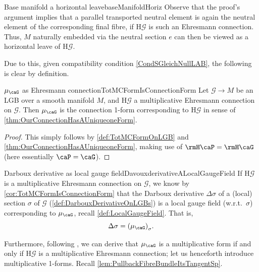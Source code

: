 \documentclass[reqno,a4paper,oneside]{amsart}
\newcommand\mutot{\mu_\caG}
\theoremstyle{plain}
\theoremstyle{remark}
\theoremstyle{definition}
\begin{document}
\begin{remarks}{Base manifold a horizontal leave}{baseManifoldHoriz}
Observe that the proof's argument implies that a parallel transported neutral element is again the neutral element of the corresponding final fibre, if $\mathrm{H}\mathcal{G}$ is such an Ehresmann connection. Thus, $M$ naturally embedded via the neutral section $e$ can then be viewed as a horizontal leave of $\mathrm{H}\mathcal{G}$.
\end{remarks}

Due to this, given compatibility condition \eqref{CondSGleichNullLAB}, the following is clear by definition.

\begin{corollaries}{$\mutot$ as Ehresmann connection}{TotMCFormIsConnectionForm}
Let $\mathcal{G} \to M$ be an LGB over a smooth manifold $M$, and $\mathrm{H}\mathcal{G}$ a multiplicative Ehresmann connection on $\mathcal{G}$. Then $\mutot$ is the connection 1-form corresponding to $\mathrm{H}\mathcal{G}$ in sense of \ref{thm:OurConnectionHasAUniqueoneForm}.
\end{corollaries}

\begin{proof}
\leavevmode\newline
This simply follows by \ref{def:TotMCFormOnLGB} and \ref{thm:OurConnectionHasAUniqueoneForm}, making use of $\rmH \caP = \rmH \caG$ (here essentially $\caP = \caG$).
\end{proof}

\begin{remarks}{Darboux derivative as local gauge field}{DavouxderivativeALocalGaugeField}
If $\mathrm{H}\mathcal{G}$ is a multiplicative Ehresmann connection on $\mathcal{G}$, we know by \ref{cor:TotMCFormIsConnectionForm} that the Darboux derivative $\Delta \sigma$ of a (local) section $\sigma$ of $\mathcal{G}$ (\ref{def:DarbouxDerivativeOnLGBs}) is a local gauge field (w.r.t.\ $\sigma$) corresponding to $\mutot$, recall \ref{def:LocalGaugeField}. That is,
\begin{equation*}
\Delta \sigma
=
\mleft(\mutot\mright)_\sigma.
\end{equation*}
\end{remarks}

Furthermore, following \cite{LAURENTGENGOUXStienonXuMultiplicativeForms}, we can derive that $\mutot$ is a multiplicative form if and only if $\mathrm{H}\mathcal{G}$ is a multiplicative Ehresmann connection; let us henceforth introduce multiplicative 1-forms. Recall \ref{lem:PullbackFibreBundleItsTangentSp}.
\end{document}
